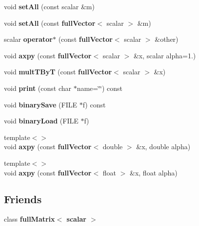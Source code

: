 \begin{DoxyCompactItemize}
\item 
void {\bfseries set\-All} (const scalar \&m)\label{classfullVector_ac6f541e966a87ec8e40f1affca3997ab}

\item 
void {\bfseries set\-All} (const {\bf full\-Vector}$<$ scalar $>$ \&m)\label{classfullVector_ad29e1d9256fad352a3b8dba5fbed39eb}

\item 
scalar {\bfseries operator$\ast$} (const {\bf full\-Vector}$<$ scalar $>$ \&other)\label{classfullVector_ad82863fd38ad347574471e7a8f6f7faa}

\item 
void {\bfseries axpy} (const {\bf full\-Vector}$<$ scalar $>$ \&x, scalar alpha=1.)\label{classfullVector_ae57d3f44463f6b0390eed329cf915ee4}

\item 
void {\bfseries mult\-T\-By\-T} (const {\bf full\-Vector}$<$ scalar $>$ \&x)\label{classfullVector_a47348058ffa666314924fa32d368e66a}

\item 
void {\bfseries print} (const char $\ast$name=\char`\"{}\char`\"{}) const \label{classfullVector_a9dfdc46fed51ff1bb903ed27c750f0ab}

\item 
void {\bfseries binary\-Save} (F\-I\-L\-E $\ast$f) const \label{classfullVector_addd14dfd7c7538980cb161171aa727e1}

\item 
void {\bfseries binary\-Load} (F\-I\-L\-E $\ast$f)\label{classfullVector_adfe83dc547b69be33be73e41a9b08b54}

\item 
{\footnotesize template$<$$>$ }\\void {\bfseries axpy} (const {\bf full\-Vector}$<$ double $>$ \&x, double alpha)\label{classfullVector_a7cb657d55d3be9ed72e526adb1f1eb5a}

\item 
{\footnotesize template$<$$>$ }\\void {\bfseries axpy} (const {\bf full\-Vector}$<$ float $>$ \&x, float alpha)\label{classfullVector_aa13101a6028ab55c070d44a5ef101662}

\end{DoxyCompactItemize}
\subsection*{Friends}
\begin{DoxyCompactItemize}
\item 
class {\bfseries full\-Matrix$<$ scalar $>$}\label{classfullVector_a99bcc788e28d2395beb20c1f995c359f}

\end{DoxyCompactItemize}


